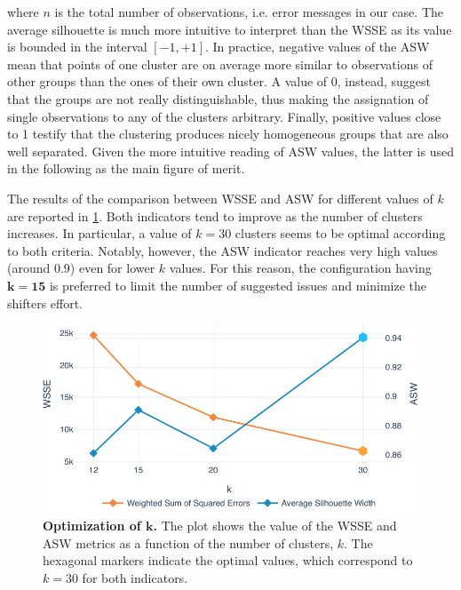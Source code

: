 where $n$ is the total number of observations, i.e. error messages in our case.
The average silhouette is much more intuitive to interpret than the WSSE as its value is bounded in the interval $\left[ -1, +1 \right]$.
In practice, negative values of the ASW mean that points of one cluster are on average more similar to observations of other groups than the ones of their own cluster. A value of 0, instead, suggest that the groups are not really distinguishable, thus making the assignation of single observations to any of the clusters arbitrary.
Finally, positive values close to 1 testify that the clustering produces nicely homogeneous groups that are also well separated.
Given the more intuitive reading of ASW values, the latter is used in the following as the main figure of merit.


The results of the comparison between WSSE and ASW for different values of $k$ are reported in \cref{fig:k_optim}.
Both indicators tend to improve as the number of clusters increases.
In particular, a value of $k=30$ clusters seems to be optimal according to both criteria.
Notably, however, the ASW indicator reaches very high values (around 0.9) even for lower $k$ values.
For this reason, the configuration having $\boldsymbol{k=15}$ is preferred to limit the number of suggested issues and minimize the shifters effort.

\begin{figure}
    \centering
    \includegraphics[width=\textwidth]{figures/410_method/kmeans/k_optim.pdf}
    \caption{\textbf{Optimization of $\boldsymbol{k}$.} The plot shows the value of the WSSE and ASW metrics as a function of the number of clusters, $k$. The hexagonal markers indicate the optimal values, which correspond to $k=30$ for both indicators.}
    \label{fig:k_optim}
\end{figure}
